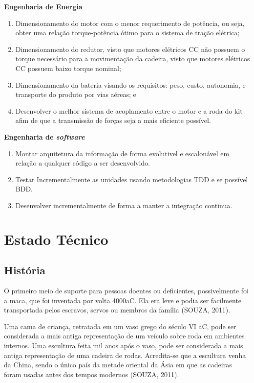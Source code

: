 \textbf{Engenharia de Energia}
  \begin{enumerate}
    \item Dimensionamento do motor com o menor requerimento de potência, ou seja, obter uma relação torque-potência ótimo para o sistema de tração elétrica;
    \item Dimensionamento do redutor, visto que motores elétricos CC não possuem o torque necessário para a movimentação da cadeira, visto que motores elétricos CC possuem baixo torque nominal;
    \item Dimensionamento da bateria visando os requisitos: peso, custo, autonomia, e transporte do produto por vias aéreas; e
    \item Desenvolver o melhor sistema de acoplamento entre o motor e a roda do kit afim de que a transmissão de forças seja a mais eficiente possível.
  \end{enumerate}

\textbf{Engenharia de \textit{software}}
  \begin{enumerate}
    \item Montar arquitetura da informação de forma evolutivel e escalonável em relação a qualquer código a ser desenvolvido.
    \item Testar Incrementalmente as unidades usando metodologias TDD e se possível BDD.
    \item Desenvolver incrementalmente de forma a manter a integração continua.
  \end{enumerate}

\section{Estado Técnico}

\subsection{História}
O primeiro meio de suporte para pessoas doentes ou deficientes, possivelmente foi a maca, que foi inventada por volta 4000aC. Ela era leve e podia ser facilmente transportada pelos escravos, servos ou membros da família (SOUZA, 2011).

Uma cama de criança, retratada em um vaso grego do século VI aC, pode ser considerada a mais antiga representação de um veículo sobre roda em ambientes internos. Uma escultura feita mil anos após o vaso, pode ser considerada a mais antiga representação de uma cadeira de rodas. Acredita-se que a escultura venha da China, sendo o único país da metade oriental da Ásia em que as cadeiras foram usadas antes dos tempos modernos (SOUZA, 2011).

